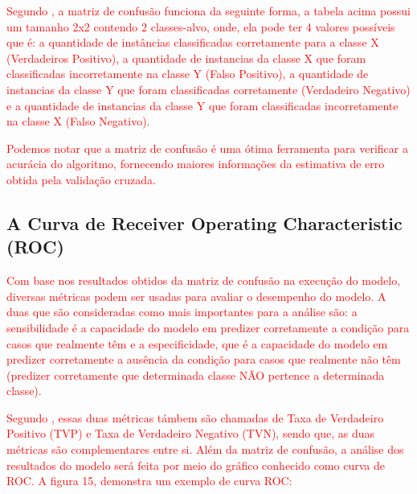 \par
\textcolor{red}{Segundo , a  matriz de confusão funciona da seguinte forma, a tabela acima possui um tamanho 2x2 contendo 2 classes-alvo, onde, ela pode ter 4 valores possíveis que é: a quantidade de instâncias classificadas corretamente para a classe X (Verdadeiros Positivo), a quantidade de instancias da classe X que foram classificadas incorretamente na classe Y (Falso Positivo), a quantidade de instancias da classe Y que foram classificadas corretamente (Verdadeiro Negativo) e a quantidade de instancias da classe Y que foram classificadas incorretamente na classe X (Falso Negativo).}

\par
\textcolor{red}{Podemos notar que a matriz de confusão é uma ótima ferramenta para verificar a acurácia do algoritmo, fornecendo maiores informações da estimativa de erro obtida pela validação cruzada.}

\subsection{A Curva de Receiver Operating Characteristic (ROC)}

\par
\textcolor{red}{Com base nos resultados obtidos da matriz de confusão na execução do modelo, diversas métricas podem ser usadas para avaliar o desempenho do modelo. A duas que são consideradas como mais importantes para a análise são: a sensibilidade é a capacidade do modelo em predizer corretamente a condição para casos que realmente têm e a especificidade, que é a capacidade do modelo em predizer corretamente a ausência da condição para casos que realmente não têm (predizer corretamente que determinada classe NÃO pertence a determinada classe)\cite{Cesar, Carvalho2014}.}

\par
\textcolor{red}{Segundo , essas duas métricas támbem são chamadas de Taxa de Verdadeiro Positivo (TVP) e Taxa de Verdadeiro Negativo (TVN), sendo que, as duas métricas são complementares entre si. Além da matriz de confusão, a análise dos resultados do modelo será feita por meio do gráfico conhecido como curva de ROC. A figura 15, demonstra um exemplo de curva ROC:}


